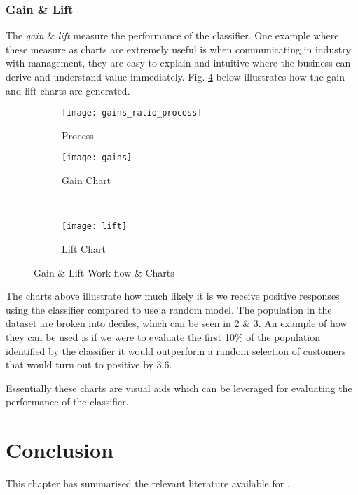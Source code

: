 \subsubsection{Gain \& Lift}
The \textit{gain} \& \textit{lift} measure the performance of the classifier. One example where these measure as charts are extremely useful is when communicating in industry with management, they are easy to explain and intuitive where the business can derive and understand value immediately. Fig. \ref{fig:GainLiftWorkflowCharts} below illustrates how the gain and lift charts are generated. 

\begin{figure}[H]
	\centering
	\begin{subfigure}[b]{0.90\textwidth}
		\captionsetup{font=scriptsize}
		\texttt{[image: gains\_ratio\_process]}\caption{Process}\label{fig:gains_ratio_process}
	\end{subfigure} 
	\medskip
	\newline
	\begin{subfigure}[b]{0.45\textwidth}
		\captionsetup{font=scriptsize}
		\texttt{[image: gains]}
		\caption{Gain Chart}\label{fig:gains}
	\end{subfigure} ~\quad
	\begin{subfigure}[b]{0.45\textwidth}
		\captionsetup{font=scriptsize}
		\texttt{[image: lift]}
		\caption{Lift Chart}\label{fig:lift}
	\end{subfigure}
	\caption{Gain \& Lift Work-flow \& Charts}
	\label{fig:GainLiftWorkflowCharts}
\end{figure}

The charts above illustrate how much likely it is we receive positive responses using the classifier compared to use a random model. The population in the dataset are broken into deciles, which can be seen in \ref{fig:gains} \& \ref{fig:lift}. An example of how they can be used is if we were to evaluate the first 10\% of the population identified by the classifier it would outperform a random selection of customers that would turn out to positive by 3.6.

Essentially these charts are visual aids which can be leveraged for evaluating the performance of the classifier. 

\section{Conclusion}\label{sotaConc}
This chapter has summarised the relevant literature available for ...
